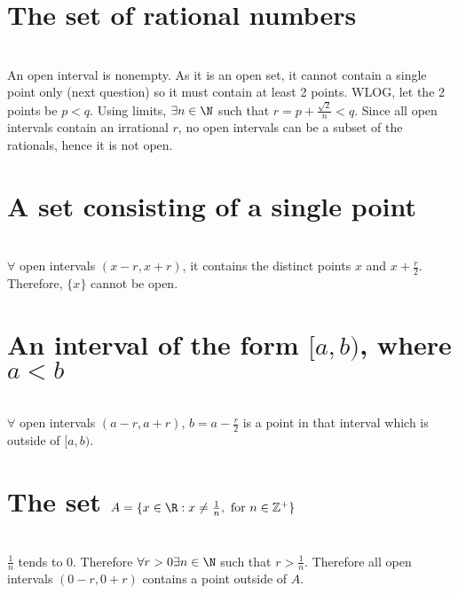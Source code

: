 \begin{parts}
 
 \part{The set of rational numbers}
 
 
\begin{solution}
 \\An open interval is nonempty. As it is an open set, it cannot contain a single point only (next question) so it must contain at least 2 points. WLOG, let the 2 points be $p < q$. Using limits, $\exists n \in \N$ such that $r = p + \frac{\sqrt{2}}{n} < q$. Since all open intervals contain an irrational $r$, no open intervals can be a subset of the rationals, hence it is not open.
\end{solution}

 \part{A set consisting of a single point}
 
 
\begin{solution}
 \\$\forall$ open intervals $(x-r,x+r)$, it contains the distinct points $x$ and $x+\frac{r}{2}$. Therefore, $\{x\}$ cannot be open.
\end{solution}

 \part{An interval of the form $[a,b)$, where $a < b$}
 
 
\begin{solution}
\\ $\forall$ open intervals $(a-r,a+r)$, $b=a-\frac{r}{2}$ is a point in that interval which is outside of $[a,b)$.
\end{solution}

 \part{The set $A = \{x\in\R:x\neq\frac{1}{n},\text{ for }n\in\mathbb{Z}^+\}$}
 
 
\begin{solution}
\\ $\frac{1}{n}$ tends to 0. Therefore $\forall r > 0 \exists n \in \N$ such that $r > \frac{1}{n}$. Therefore all open intervals $(0-r,0+r)$ contains a point outside of $A$.
\end{solution}
\end{parts}

